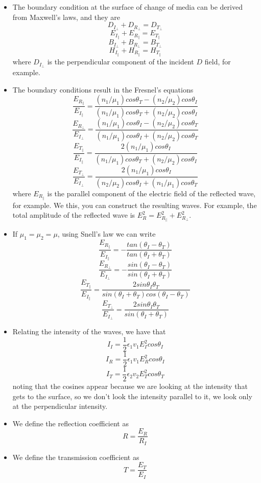 \documentclass[oneside, 12pt]{book}
\begin{document}
\begin{itemize}
    \item The boundary condition at the surface of change of media can be derived from Maxwell's laws, and they are
    $$D_{I_{\perp}} + D_{R_{\perp}}= D_{T_{\perp}}$$
    $$E_{I_{\parallel}} + E_{R_{\parallel}} = E_{T_{\parallel}}$$
    $$B_{I_{\perp}} + B_{R_{\perp}} = B_{T_{\perp}}$$
    $$H_{I_{\parallel}} + H_{R_{\parallel}} = H_{T_{\parallel}}$$
    where $D_{I_{\perp}}$ is the perpendicular component of the incident $D$ field, for example.
    \item The boundary conditions result in the Fresnel's equations
    $$\frac{E_{R_{\parallel}}}{E_{I_{\parallel}}} = \frac{(n_1/\mu_1)cos\theta_T - (n_2/\mu_2)cos\theta_I}{(n_1/\mu_1)cos\theta_T + (n_2/\mu_2)cos\theta_I}$$
    $$\frac{E_{R_{\perp}}}{E_{I_{\perp}}} = \frac{(n_1/\mu_1)cos\theta_I - (n_2/\mu_2)cos\theta_T}{(n_1/\mu_1)cos\theta_I + (n_2/\mu_2)cos\theta_T}$$
    $$\frac{E_{T_{\parallel}}}{E_{I_{\parallel}}}  = \frac{2(n_1/\mu_1)cos\theta_I}{(n_1/\mu_1)cos\theta_T + (n_2/\mu_2)cos\theta_I}$$
    $$\frac{E_{T_{\perp}}}{E_{I_{\perp}}} = \frac{2(n_1/\mu_1)cos\theta_I}{(n_2/\mu_2)cos\theta_I + (n_1/\mu_1)cos\theta_T}$$
    where $E_{R_{\parallel}}$ is the parallel component of the electric field of the reflected wave, for example. We this, you can construct the resulting waves. For example, the total amplitude of the reflected wave is $E_R^2 = E_{R_{\parallel}}^2 + E_{R_{\perp}}^2$.
    \item If $\mu_1 = \mu_2 = \mu$, using Snell's law we can write
    $$\frac{E_{R_{\parallel}}}{E_{I_{\parallel}}} = -\frac{tan(\theta_I - \theta_T)}{tan(\theta_I + \theta_T)}$$
    $$\frac{E_{R_{\perp}}}{E_{I_{\perp}}} = -\frac{sin(\theta_I - \theta_T)}{sin(\theta_I + \theta_T)}$$
    $$\frac{E_{T_{\parallel}}}{E_{I_{\parallel}}} = \frac{2sin\theta_I\theta_T}{sin(\theta_I + \theta_T)cos(\theta_I - \theta_T)}$$
    $$\frac{E_{T_{\perp}}}{E_{I_{\perp}}} = \frac{2sin\theta_I\theta_T}{sin(\theta_I + \theta_T)}$$
    \item Relating the intensity of the waves, we have that
    $$I_I = \frac{1}{2}\epsilon_1 v_1 E_I^2 cos\theta_I$$
    $$I_R = \frac{1}{2}\epsilon_1 v_1 E_R^2 cos\theta_I$$
    $$I_T = \frac{1}{2}\epsilon_2 v_2 E_T^2 cos\theta_T$$
    noting that the cosines appear because we are looking at the intensity that gets to the surface, so we don't look the intensity parallel to it, we look only at the perpendicular intensity.
    \item We define the reflection coefficient as
    $$R = \frac{E_R}{R_I}$$
    \item We define the transmission coefficient as
    $$T = \frac{E_T}{E_I}$$
\end{itemize}
\end{document}
